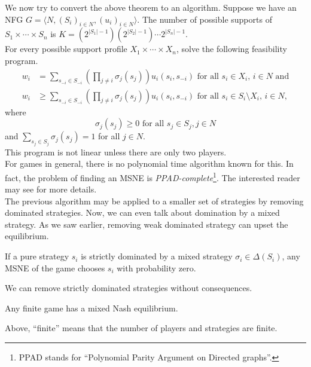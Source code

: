 	We now try to convert the above theorem to an algorithm. Suppose we have an NFG $G = \langle N , (S_i)_{i \in N} , (u_i)_{i \in N} \rangle$. The number of possible supports of $S_1 \times \cdots \times S_n$ is $K = (2^{|S_1|-1})(2^{|S_2|-1})\cdots2^{|S_n|-1}$.\\
	For every possible support profile $X_1 \times \cdots \times X_n$, solve the following feasibility program.
	\begin{align*}
		w_i &= \sum_{s_{-i} \in S_{-i}} \left( \prod_{j \ne i} \sigma_j(s_j) \right) u_i(s_i,s_{-i}) \text{ for all $s_i \in X_i$, $i \in N$ and} \\
		w_i &\ge \sum_{s_{-i} \in S_{-i}} \left( \prod_{j \ne i} \sigma_j(s_j) \right) u_i(s_i,s_{-i}) \text{ for all $s_i \in S_i \setminus X_i$, $i \in N$,}
	\end{align*}
	where
	\[ \sigma_j(s_j) \ge 0 \text{ for all $s_j \in S_j,j\in N$} \]
	and $\sum_{s_j \in S_j} \sigma_j(s_j) = 1$ for all $j \in N$.\\
	This program is not linear unless there are only two players.\\
	For games in general, there is no polynomial time algorithm known for this. In fact, the problem of finding an MSNE is \emph{PPAD-complete}\footnote{PPAD stands for ``Polynomial Parity Argument on Directed graphs''.}. The interested reader may see \cite{Daskalakis2009TheCO} for more details.\\

	The previous algorithm may be applied to a smaller set of strategies by removing dominated strategies. Now, we can even talk about domination by a mixed strategy. As we saw earlier, removing weak dominated strategy can upset the equilibrium. 

	\begin{ftheo}
		If a pure strategy $s_i$ is strictly dominated by a mixed strategy $\sigma_i \in \Delta(S_i)$, any MSNE of the game chooses $s_i$ with probability zero.
	\end{ftheo}
	We can remove strictly dominated strategies without consequences.

	\begin{ftheo}
		Any finite game has a mixed Nash equilibrium.
	\end{ftheo}
	Above, ``finite'' means that the number of players and strategies are finite.